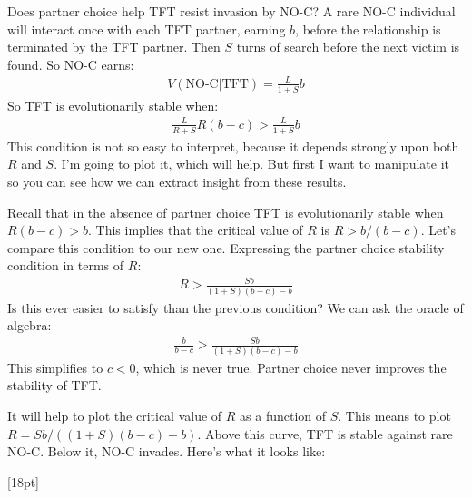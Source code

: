 \documentclass[10pt,reqno]{amsbook}
\newcommand{\margincap}[2][10pt]{\marginnote{\small\emph{#2}}[#1]}
\newcounter{myfigure}[chapter]
\newcommand{\figmarlab}[2][18pt]{%
  \refstepcounter{myfigure}%
  \label{#2}%
  \margincap[#1]{Figure\\\thechapter.\themyfigure}%
}
\numberwithin{equation}{chapter}
\begin{document}
Does partner choice help TFT resist invasion by NO-C? A rare NO-C individual will interact once with each TFT partner, earning $b$, before the relationship is terminated by the TFT partner. Then $S$ turns of search before the next victim is found. So NO-C earns:
\begin{align*}
	V(\text{NO-C}|\text{TFT}) = \frac{L}{1+S}b
\end{align*}
So TFT is evolutionarily stable when:
\begin{align*}
	\frac{L}{R+S}R(b-c) > \frac{L}{1+S}b
\end{align*}
This condition is not so easy to interpret, because it depends strongly upon both $R$ and $S$. I'm going to plot it, which will help. But first I want to manipulate it so you can see how we can extract insight from these results. 

Recall that in the absence of partner choice TFT is evolutionarily stable when $R(b-c)>b$. This implies that the critical value of $R$ is $R>b/(b-c)$. Let's compare this condition to our new one. Expressing the partner choice stability condition in terms of $R$:
\begin{align*}
	R > \frac{Sb}{(1+S)(b-c)-b}
\end{align*}
Is this ever easier to satisfy than the previous condition? We can ask the oracle of algebra:
\begin{align*}
	\frac{b}{b-c} > \frac{Sb}{(1+S)(b-c)-b}
\end{align*}
This simplifies to $c<0$, which is never true. Partner choice never improves the stability of TFT.

It will help to plot the critical value of $R$ as a function of $S$. This means to plot $R={Sb}/{((1+S)(b-c)-b)}$. Above this curve, TFT is stable against rare NO-C. Below it, NO-C invades. Here's what it looks like:

\vspace{-6pt}
\figmarlab{figR2}
\begin{center}
\end{center}
\end{document}
